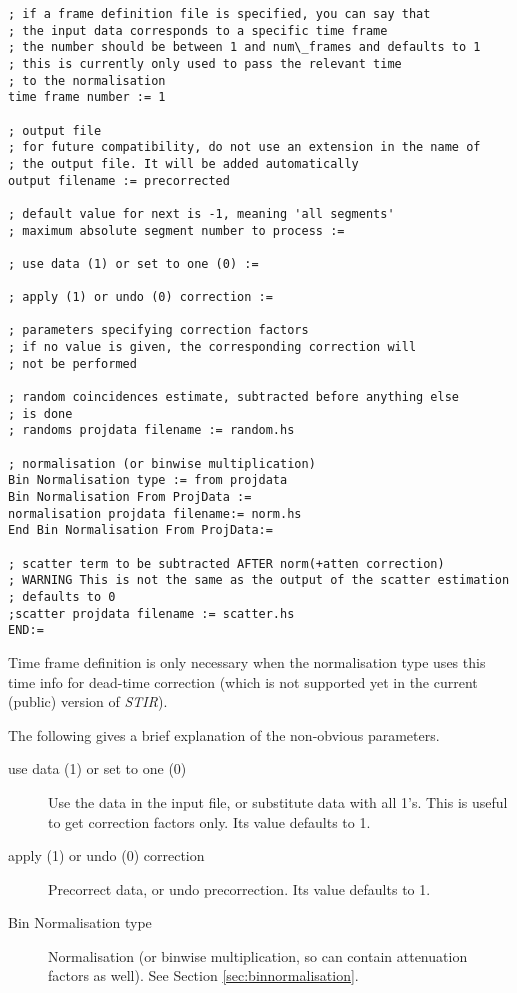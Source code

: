 \documentclass{article}
\begin{document}
{{\begin{verbatim}
; if a frame definition file is specified, you can say that 
; the input data corresponds to a specific time frame
; the number should be between 1 and num\_frames and defaults to 1
; this is currently only used to pass the relevant time 
; to the normalisation 
time frame number := 1

; output file
; for future compatibility, do not use an extension in the name of 
; the output file. It will be added automatically 
output filename := precorrected

; default value for next is -1, meaning 'all segments' 
; maximum absolute segment number to process :=  

; use data (1) or set to one (0) := 

; apply (1) or undo (0) correction := 

; parameters specifying correction factors 
; if no value is given, the corresponding correction will
; not be performed

; random coincidences estimate, subtracted before anything else 
; is done
; randoms projdata filename := random.hs 

; normalisation (or binwise multiplication) 
Bin Normalisation type := from projdata 
Bin Normalisation From ProjData := 
normalisation projdata filename:= norm.hs 
End Bin Normalisation From ProjData:=

; scatter term to be subtracted AFTER norm(+atten correction)
; WARNING This is not the same as the output of the scatter estimation
; defaults to 0 
;scatter projdata filename := scatter.hs
END:=
\end{verbatim}


Time frame definition is only necessary when the normalisation 
type uses this time info for dead-time correction (which is not 
supported yet in the current (public) version of \textit{STIR}).


The following gives a brief explanation of the non-obvious parameters. 

\begin{description}

\item[use data (1) or set to one (0)]
Use the data in the input file, or substitute data with all 1's. 
This is useful to get correction factors only. Its value defaults 
to 1.

\item[apply (1) or undo (0) correction]
Precorrect data, or undo precorrection. Its value defaults to 
1.

\item[Bin Normalisation type]
Normalisation (or binwise multiplication, so can contain attenuation 
factors as well). See Section \ref{sec:binnormalisation}.



\end{description}}}
\end{document}

